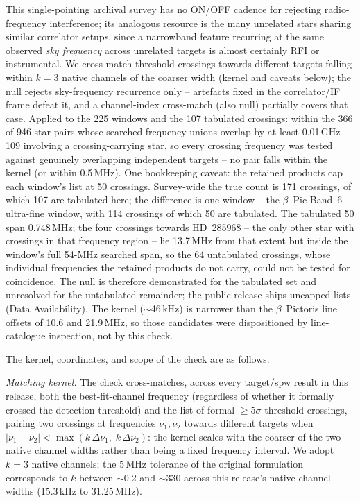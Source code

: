 \documentclass{openjournal}
\begin{document}
This single-pointing archival survey has no ON/OFF cadence for
rejecting radio-frequency interference; its analogous resource is the
many unrelated stars sharing similar correlator setups, since a
narrowband feature recurring at the same observed \emph{sky
frequency} across unrelated targets is almost certainly RFI or
instrumental. We cross-match threshold crossings towards different
targets falling within $k=3$ native channels of the coarser width
(kernel and caveats below); the null
rejects sky-frequency recurrence only -- artefacts fixed in the
correlator/IF frame defeat it, and a channel-index cross-match (also
null) partially covers that case. Applied to the 225 windows and the
107 tabulated crossings: within the 366 of 946 star pairs whose
searched-frequency unions overlap by at least 0.01\,GHz -- 109
involving a crossing-carrying star, so every crossing frequency was
tested against genuinely overlapping independent targets -- no pair
falls within the kernel (or within 0.5\,MHz). One bookkeeping caveat:
the retained products cap each window's list at 50 crossings.
Survey-wide the true count is 171 crossings, of which 107 are
tabulated here; the difference is one window -- the $\beta$~Pic
Band~6 ultra-fine window, with 114 crossings of which 50 are
tabulated. The tabulated 50 span 0.748\,MHz; the four crossings
towards HD~285968 -- the only other star with crossings in that
frequency region -- lie 13.7\,MHz from that extent but inside the
window's full 54-MHz searched span, so the 64 untabulated crossings,
whose individual frequencies the retained products do not carry,
could not be tested for coincidence. The null is therefore
demonstrated for the tabulated set and unresolved for the untabulated
remainder; the public release ships uncapped lists (Data
Availability). The kernel ($\sim$46\,kHz) is narrower than the
$\beta$~Pictoris line offsets of 10.6 and 21.9\,MHz, so those
candidates were dispositioned by line-catalogue inspection, not by
this check.


The kernel, coordinates, and scope of the check are as follows.

\emph{Matching kernel.} The check cross-matches, across every
target/spw result in this release, both the best-fit-channel frequency
(regardless of whether it formally crossed the detection threshold)
and the list of formal $\geq5\sigma$ threshold crossings, pairing two
crossings at
frequencies $\nu_1, \nu_2$ towards different targets when
$|\nu_1-\nu_2| < \max(k\,\Delta\nu_1,\; k\,\Delta\nu_2)$: the kernel
scales with the coarser of the two native channel widths rather than
being a fixed frequency interval. We adopt $k=3$ native channels; the
5\,MHz tolerance of the original formulation corresponds to $k$
between $\sim$0.2 and $\sim$330 across this release's native channel
widths (15.3\,kHz to 31.25\,MHz).
\end{document}
